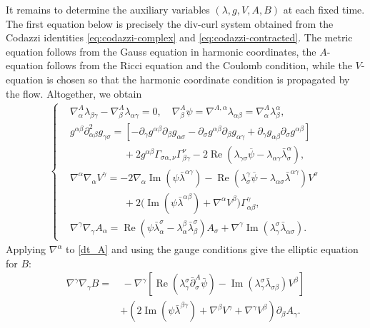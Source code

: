 \documentclass[11pt,letterpaper,reqno]{amsart}
\numberwithin{equation}{section}
\theoremstyle{definition}
\theoremstyle{remark}
\begin{document}
It remains to determine the auxiliary variables
\(
(\lambda,g,V,A,B)
\)
at each fixed time. The first equation below is precisely the div-curl
system obtained from the Codazzi identities
\eqref{eq:codazzi-complex} and
\eqref{eq:codazzi-contracted}. The metric equation follows from the Gauss
equation in harmonic coordinates, the \(A\)-equation follows from the
Ricci equation and the Coulomb condition, while the \(V\)-equation is chosen
so that the harmonic coordinate condition is propagated by the flow.
Altogether, we obtain
\begin{align} \label{eq_ell}
	\left\{\begin{aligned}
	& \nabla_\alpha^A \lambda_{\beta \gamma}-\nabla_\beta^A \lambda_{\alpha \gamma}=0, \quad \nabla_\beta^A \psi=\nabla^{A, \alpha} \lambda_{\alpha \beta}=\nabla_{\alpha}^A \lambda^\alpha_\beta, \\
	& g^{\alpha \beta} \partial_{\alpha \beta}^2 g_{\gamma \sigma}= {\left[-\partial_\gamma g^{\alpha \beta} \partial_\beta g_{\alpha \sigma}-\partial_\sigma g^{\alpha \beta} \partial_\beta g_{\alpha \gamma}+\partial_\gamma g_{\alpha \beta} \partial_\sigma g^{\alpha \beta}\right] } \\
	&\qquad\qquad\quad\,\,+2 g^{\alpha \beta} \Gamma_{\sigma \alpha, \nu} \Gamma_{\beta \gamma}^\nu-2 \operatorname{Re}\left(\lambda_{\gamma \sigma} \overline{\psi}-\lambda_{\alpha \gamma} \bar{\lambda}_\sigma^\alpha\right), \\
	& \nabla^\alpha \nabla_\alpha V^\gamma=-2 \nabla_\alpha \operatorname{Im}\left(\psi \bar{\lambda}^{\alpha \gamma}\right)-\operatorname{Re}\left(\lambda_\sigma^\gamma \overline{\psi}-\lambda_{\alpha \sigma} \bar{\lambda}^{\alpha \gamma}\right) V^\sigma \\
	&\qquad\qquad\quad\,\,+2\big(\operatorname{Im} (\psi \bar{\lambda}^{\alpha \beta})+\nabla^\alpha V^\beta\big) \Gamma_{\alpha \beta}^\gamma, \\
	& \nabla^\gamma \nabla_\gamma A_\alpha= \operatorname{Re} (\psi \bar{\lambda}_\alpha^\sigma-\lambda_\alpha^\beta \bar{\lambda}_\beta^\sigma ) A_\sigma+\nabla^\gamma \operatorname{Im}\left(\lambda_\gamma^\sigma \bar{\lambda}_{\alpha \sigma}\right).
\end{aligned}\right.
\end{align}
Applying \(\nabla^\alpha\) to \eqref{dt_A} and using the gauge conditions
give the elliptic equation for \(B\):
\begin{align}
		\nabla^\gamma\nabla_\gamma B
=&\,
-\nabla^\gamma\left[
\operatorname{Re}\left(\lambda_\gamma^\sigma
\bar\partial^A_\sigma\bar\psi\right)
-
\operatorname{Im}\left(\lambda_\gamma^\sigma
\bar\lambda_{\sigma\beta}\right)V^\beta
\right]
\nonumber\\
&+
\left(
2\operatorname{Im}\left(\psi\bar\lambda^{\beta\gamma}\right)
+\nabla^\beta V^\gamma+\nabla^\gamma V^\beta
\right)\partial_\beta A_\gamma.
\label{eq:B-elliptic}
\end{align}
\end{document}
